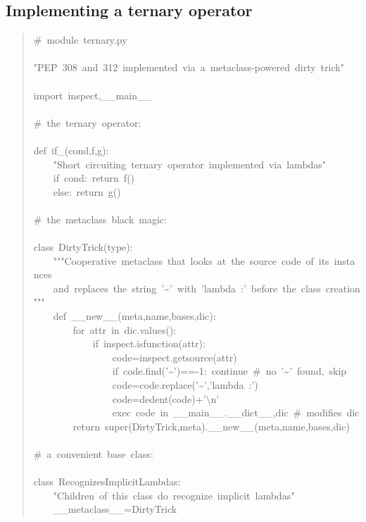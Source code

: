 \documentclass[10pt,english]{article}
\begin{document}
\subsection*{Implementing a ternary operator}
\begin{quote}
\begin{ttfamily}\begin{flushleft}
\mbox{{\#}~module~ternary.py}\\
\mbox{}\\
\mbox{"PEP~308~and~312~implemented~via~a~metaclass-powered~dirty~trick"}\\
\mbox{}\\
\mbox{import~inspect,{\_}{\_}main{\_}{\_}}\\
\mbox{}\\
\mbox{{\#}~the~ternary~operator:}\\
\mbox{}\\
\mbox{def~if{\_}(cond,f,g):}\\
\mbox{~~~~"Short~circuiting~ternary~operator~implemented~via~lambdas"}\\
\mbox{~~~~if~cond:~return~f()}\\
\mbox{~~~~else:~return~g()}\\
\mbox{}\\
\mbox{{\#}~the~metaclass~black~magic:}\\
\mbox{}\\
\mbox{class~DirtyTrick(type):}\\
\mbox{~~~~"""Cooperative~metaclass~that~looks~at~the~source~code~of~its~instances~}\\
\mbox{~~~~and~replaces~the~string~'{\textasciitilde}'~with~'lambda~:'~before~the~class~creation"""}\\
\mbox{~~~~def~{\_}{\_}new{\_}{\_}(meta,name,bases,dic):}\\
\mbox{~~~~~~~~for~attr~in~dic.values():}\\
\mbox{~~~~~~~~~~~~if~inspect.isfunction(attr):~}\\
\mbox{~~~~~~~~~~~~~~~~code=inspect.getsource(attr)}\\
\mbox{~~~~~~~~~~~~~~~~if~code.find('{\textasciitilde}')==-1:~continue~{\#}~no~'{\textasciitilde}'~found,~skip}\\
\mbox{~~~~~~~~~~~~~~~~code=code.replace('{\textasciitilde}','lambda~:')}\\
\mbox{~~~~~~~~~~~~~~~~code=dedent(code)+'{\textbackslash}n'}\\
\mbox{~~~~~~~~~~~~~~~~exec~code~in~{\_}{\_}main{\_}{\_}.{\_}{\_}dict{\_}{\_},dic~{\#}~modifies~dic}\\
\mbox{~~~~~~~~return~super(DirtyTrick,meta).{\_}{\_}new{\_}{\_}(meta,name,bases,dic)}\\
\mbox{}\\
\mbox{{\#}~a~convenient~base~class:}\\
\mbox{}\\
\mbox{class~RecognizesImplicitLambdas:}\\
\mbox{~~~~"Children~of~this~class~do~recognize~implicit~lambdas"}\\
\mbox{~~~~{\_}{\_}metaclass{\_}{\_}=DirtyTrick}
\end{flushleft}\end{ttfamily}
\end{quote}
\end{document}
